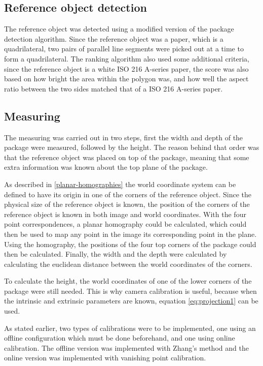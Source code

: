 \subsection{Reference object detection}
The reference object was detected using a modified version of the package detection algorithm.
Since the reference object was a paper, which is a quadrilateral, two pairs of parallel line segments were picked out at a time to form a quadrilateral.
The ranking algorithm also used some additional criteria, since the reference object is a white ISO 216 A-series  paper, the score was also based on how bright the area within the polygon was, and how well the aspect ratio between the two sides matched that of a ISO 216 A-series paper.

\subsection{Measuring} %
The measuring was carried out in two steps, first the width and depth of the package were measured, followed by the height. 
The reason behind that order was that the reference object was placed on top of the package, meaning that some extra information was known about the  top plane of the package.

As described in \ref{planar-homographies} the world coordinate system can be defined to have its origin in one of the corners of the reference object.
Since the physical size of the reference object is known, the position of the corners of the reference object is known in both image and world coordinates.
With the four point correspondences, a planar homography could be calculated, which could then be used to map any point in the image its corresponding point in the plane.
Using the homography, the positions of the four top corners of the package could then be calculated. 
Finally, the width and the depth were calculated by calculating the euclidean distance between the world coordinates of the corners.

To calculate the height, the world coordinates of one of the lower corners of the package were still needed.
This is why camera calibration is useful, because when the intrinsic and extrinsic parameters are known, equation \ref{eq:projection1} can be used.

As stated earlier, two types of calibrations were to be implemented, one using an offline configuration which must be done beforehand, and one using online calibration.
The offline version was implemented with Zhang's method and the online version was implemented with vanishing point calibration.

